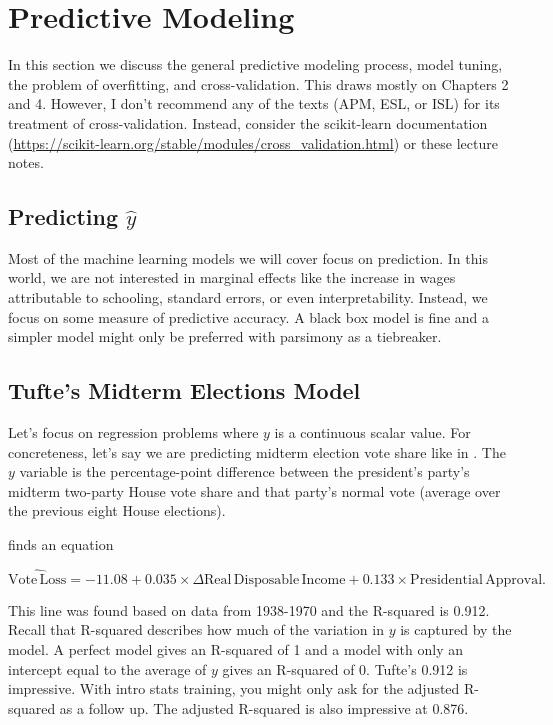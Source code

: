 \section{Predictive Modeling}

In this section we discuss the general predictive modeling process, model tuning, the problem of overfitting, and cross-validation. This draws mostly on \cite{kuhn2013applied} Chapters 2 and 4. However, I don't recommend any of the texts (APM, ESL, or ISL) for its treatment of cross-validation. Instead, consider the scikit-learn documentation (\url{https://scikit-learn.org/stable/modules/cross_validation.html}) or these lecture notes.

\subsection{Predicting $\hat{y}$}

Most of the machine learning models we will cover focus on prediction. In this world, we are not interested in marginal effects like the increase in wages attributable to schooling, standard errors, or even interpretability. Instead, we focus on some measure of predictive accuracy. A black box model is fine and a simpler model might only be preferred with parsimony as a tiebreaker.

\subsection{Tufte's Midterm Elections Model}

Let's focus on regression problems where $y$ is a continuous scalar value. For concreteness, let's say we are predicting midterm election vote share like in \cite{tufte1975determinants}. The $y$ variable is the percentage-point difference between the president's party's midterm two-party House vote share and that party's normal vote (average over the previous eight House elections).

\cite{tufte1975determinants} finds an equation 

$$\widehat{\mathrm{Vote\,Loss}} = -11.08 + 0.035\times \Delta\mathrm{Real\,Disposable\,Income} + 0.133\times \mathrm{Presidential\,Approval}.$$

This line was found based on data from 1938-1970 and the R-squared is 0.912. Recall that R-squared describes how much of the variation in $y$ is captured by the model. A perfect model gives an R-squared of 1 and a model with only an intercept equal to the average of $y$ gives an R-squared of 0. Tufte's 0.912 is impressive. With intro stats training, you might only ask for the adjusted R-squared as a follow up. The adjusted R-squared is also impressive at 0.876.

